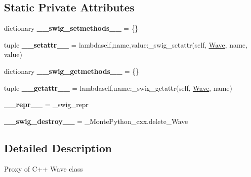 \subsection*{Static Private Attributes}
\begin{DoxyCompactItemize}
\item 
\hypertarget{classMontePython__cxx_1_1Wave_a60339e395a12ee3e8b3dfa2e1a74d205}{}dictionary {\bfseries \+\_\+\+\_\+swig\+\_\+setmethods\+\_\+\+\_\+} = \{\}\label{classMontePython__cxx_1_1Wave_a60339e395a12ee3e8b3dfa2e1a74d205}

\item 
\hypertarget{classMontePython__cxx_1_1Wave_a867c9df4d613d239bfe9029bf1472059}{}tuple {\bfseries \+\_\+\+\_\+setattr\+\_\+\+\_\+} = lambdaself,name,value\+:\+\_\+swig\+\_\+setattr(self, \hyperlink{classMontePython__cxx_1_1Wave}{Wave}, name, value)\label{classMontePython__cxx_1_1Wave_a867c9df4d613d239bfe9029bf1472059}

\item 
\hypertarget{classMontePython__cxx_1_1Wave_afaab827f51132036c2d03c5674370dca}{}dictionary {\bfseries \+\_\+\+\_\+swig\+\_\+getmethods\+\_\+\+\_\+} = \{\}\label{classMontePython__cxx_1_1Wave_afaab827f51132036c2d03c5674370dca}

\item 
\hypertarget{classMontePython__cxx_1_1Wave_ae48119d9e2e69ba1264f65009171817f}{}tuple {\bfseries \+\_\+\+\_\+getattr\+\_\+\+\_\+} = lambdaself,name\+:\+\_\+swig\+\_\+getattr(self, \hyperlink{classMontePython__cxx_1_1Wave}{Wave}, name)\label{classMontePython__cxx_1_1Wave_ae48119d9e2e69ba1264f65009171817f}

\item 
\hypertarget{classMontePython__cxx_1_1Wave_a1a0edfd15f65a15213b8a85d160269bc}{}{\bfseries \+\_\+\+\_\+repr\+\_\+\+\_\+} = \+\_\+swig\+\_\+repr\label{classMontePython__cxx_1_1Wave_a1a0edfd15f65a15213b8a85d160269bc}

\item 
\hypertarget{classMontePython__cxx_1_1Wave_a494d4fd80e3ccd8d09694966796a9082}{}{\bfseries \+\_\+\+\_\+swig\+\_\+destroy\+\_\+\+\_\+} = \+\_\+\+Monte\+Python\+\_\+cxx.\+delete\+\_\+\+Wave\label{classMontePython__cxx_1_1Wave_a494d4fd80e3ccd8d09694966796a9082}

\end{DoxyCompactItemize}


\subsection{Detailed Description}
\begin{DoxyVerb}Proxy of C++ Wave class\end{DoxyVerb}
 

